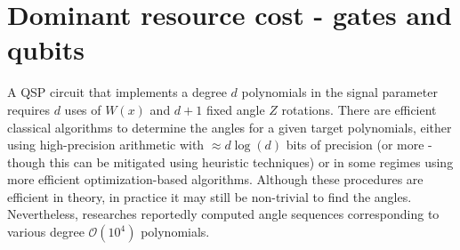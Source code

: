 \documentclass[12pt, oneside]{book}
\theoremstyle{definition}
\theoremstyle{definition}
\theoremstyle{remark}
\begin{document}
\section{Dominant resource cost - gates and qubits}
A QSP circuit that implements a degree $d$ polynomials in the signal parameter requires $d$ uses of $W(x)$ and $d+1$ fixed angle $Z$ rotations. There are efficient classical algorithms to determine the angles for a given target polynomials, either using high-precision arithmetic with $\approx d\log(d)$ bits of precision (or more - though this can be mitigated using heuristic techniques) or in some regimes using more efficient optimization-based algorithms. Although these procedures are efficient in theory, in practice it may still be non-trivial to find the angles. Nevertheless, researches reportedly computed angle sequences corresponding to various degree $\mathcal{O}(10^4)$ polynomials.
\end{document}
